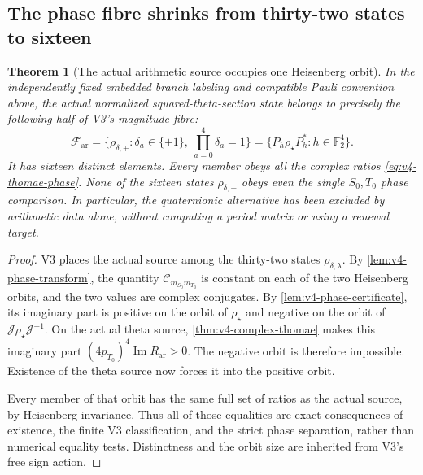 \documentclass[11pt]{article}
\newtheorem{theorem}{Theorem}[section]
\theoremstyle{definition}
\theoremstyle{remark}
\newcommand{\F}{\mathbb F}
\newcommand{\Jq}{\mathcal J}
\begin{document}
\subsection{The phase fibre shrinks from thirty-two states to sixteen}

\begin{theorem}[The actual arithmetic source occupies one Heisenberg orbit]
\label{thm:v4-holomorphic-orbit}
In the independently fixed embedded branch labeling and compatible Pauli
convention above, the actual normalized squared-theta-section state belongs
to precisely the following half of V3's magnitude fibre:
\begin{equation}
 \boxed{\mathcal F_{\mathrm{ar}}
       =\{\rho_{\delta,+}:\delta_a\in\{\pm1\},\ \prod_{a=0}^4\delta_a=1\}
       =\{P_h\rho_\star P_h^*:h\in\F_2^4\}.}
 \label{eq:v4-selected-orbit}
\end{equation}
It has sixteen distinct elements. Every member obeys all the complex
ratios \eqref{eq:v4-thomae-phase}. None of the sixteen states
$\rho_{\delta,-}$ obeys even the single $S_0,T_0$ phase comparison.
In particular, the quaternionic alternative has been excluded by arithmetic
data alone, without computing a period matrix or using a renewal target.
\end{theorem}
\begin{proof}
V3 places the actual source among the thirty-two states
$\rho_{\delta,\lambda}$. By \cref{lem:v4-phase-transform}, the quantity
$\mathcal C_{m_{S_0}m_{T_0}}$ is constant on each of the two Heisenberg
orbits, and the two values are complex conjugates. By
\cref{lem:v4-phase-certificate}, its imaginary part is positive on the
orbit of $\rho_\star$ and negative on the orbit of $\Jq\rho_\star\Jq^{-1}$.
On the actual theta source, \cref{thm:v4-complex-thomae} makes this imaginary
part $(4p_{T_0})^4\operatorname{Im}R_{\mathrm{ar}}>0$. The negative orbit
is therefore impossible. Existence of the theta source now forces it into
the positive orbit.

Every member of that orbit has the same full set of ratios as the actual
source, by Heisenberg invariance. Thus all of those equalities are exact
consequences of existence, the finite V3 classification, and the strict
phase separation, rather than numerical equality tests. Distinctness and
the orbit size are inherited from V3's free sign action.
\end{proof}
\end{document}
